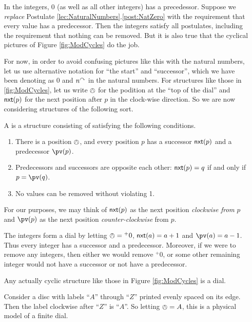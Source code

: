In the integers, $0$ (as well as all other integers) has a precedessor. Suppose we \emph{replace} Postulate \ref{lec:NaturalNumbers}.\ref{post:NatZero} with the requirement that every value has a predecessor. 
Then the integers satisfy all postulates, including the requirement that nothing can be removed.
But it is also true that the cyclical pictures of Figure \ref{fig:ModCycles} do the job. 

For now, in order to avoid confusing pictures like this with the natural numbers, let us use alternative notation for ``the start'' and ``successor'', which we have been denoting as $0$ and $n^\curvearrowright$ in the natural numbers.
For structures like those in \ref{fig:ModCycles}, let us write $\owedge$ for the podition at the ``top of the dial'' and ${\mathord{\textsf{nxt}}}(p)$ for the next position after $p$ in the clock-wise direction.
So we are now considering structures of the following sort.

\begin{defn}
	A  is a structure consisting of  satisfying the following conditions.
\begin{enumerate}
	\item There is a position $\owedge$, and every position $p$ has a successor ${\mathord{\textsf{nxt}}}(p)$ and a predecessor $\pv(p)$.
	\item Predecessors and successors are opposite each other: ${\mathord{\textsf{nxt}}}(p) = q$ if and only if $p = \pv(q)$.
	\item No values can be removed without violating 1.
\end{enumerate}

For our purposes, we may think of ${\mathord{\textsf{nxt}}}(p)$ as the next position \emph{clockwise from $p$} and $\pv(p)$ as the next position \emph{counter-clockwise} from $p$. 
\end{defn}

\begin{example}
The integers form a dial by letting $\owedge={}^+0$, ${\mathord{\textsf{nxt}}}(a)=a+1$ and $\pv(a)=a-1$. Thus
every integer has a successor and a predecessor. Moreover, if we were to remove any integers, then either we would remove ${}^+0$, or some other remaining integer would not have a successor or not have a predecessor.

Any actually cyclic structure like those in Figure \ref{fig:ModCycles} is a dial.

Consider a disc with labels ``$A$'' through ``$Z$'' printed evenly spaced on its edge. Then the label clockwise after ``$Z$'' is ``$A$''. So letting $\owedge = A$, this is a physical model of a finite dial.
\end{example}  

